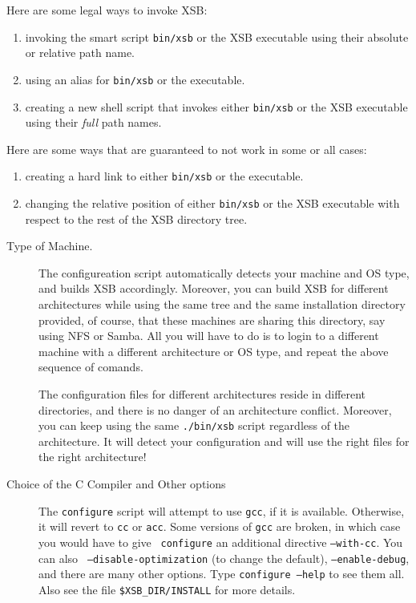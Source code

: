 Here are some legal ways to invoke XSB:
\begin{enumerate}
\item  invoking the smart script \verb|bin/xsb| or the XSB executable using
  their absolute or relative path name.
\item using an alias for \verb|bin/xsb| or the executable.
\item creating a new shell script that invokes either \verb|bin/xsb| or the
  XSB executable using their {\em full\/} path names. 
\end{enumerate}

Here are some ways that are guaranteed to not work in some or all cases:
\begin{enumerate}
\item  creating a hard link to either \verb|bin/xsb| or the executable.
\item changing the relative position of either \verb|bin/xsb| or the
  XSB executable with respect to the rest of the XSB directory tree.
\end{enumerate}

\begin{description}
\item[Type of Machine.]  The configureation script automatically detects
  your machine and OS type, and builds XSB accordingly. Moreover, you can
  build XSB for different architectures while using the same tree and the
  same installation directory provided, of course, that these machines are
  sharing this directory, say using NFS or Samba. All you will have to do
  is to login to a different machine with a different architecture or OS
  type, and repeat the above sequence of comands.
  
  The configuration files for different architectures reside in different
  directories, and there is no danger of an architecture conflict.
  Moreover, you can keep using the same {\tt ./bin/xsb} script regardless
  of the architecture. It will detect your configuration and will use the
  right files for the right architecture! 
  
\item[Choice of the C Compiler and Other options] \label{cc}
  The {\tt configure} script will attempt to use {\tt gcc}, if it is available.
  Otherwise, it will revert to {\tt cc} or {\tt acc}.  Some versions of
  {\tt gcc} are broken, in which case you would have to give {\tt
    configure} an additional directive {\tt --with-cc}.  You can also {\tt
    --disable-optimization} (to change the default), {\tt --enable-debug},
  and there are many other options.  Type {\tt configure --help} to see
  them all. Also see the file \verb'$XSB_DIR/INSTALL' for more details.
\end{description}

